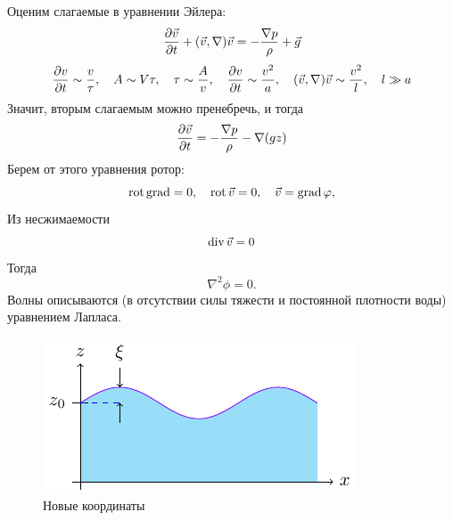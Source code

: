 Оценим слагаемые в уравнении Эйлера:
\begin{gather}
	\label{eq}
	\pdv{\vec{v}}{t}+(\vec{v},\nabla)\vec{v}=-\frac{\nabla p}{\rho}+\vec{g}
\end{gather}
\begin{gather}
	\label{eq}
	\pdv{v}{t}\sim\frac{v}{\tau}, \quad 
	A\sim V\tau, \quad \tau \sim \frac{A}{v},
	\quad \pdv{v}{t}\sim \frac{v^2}{a}, 
	\quad (\vec{v},\nabla)\vec{v}\sim \frac{v^2}{l},
	\quad l\gg a
\end{gather}
Значит, вторым слагаемым можно пренебречь, и тогда
\begin{gather}
	\label{eq}
	\pdv{\vec{v}}{t}=-\frac{\nabla p}{\rho}-\nabla(gz)
\end{gather}
Берем от этого уравнения ротор:
\begin{equation}
	\operatorname{rot}\operatorname{grad}=0, \quad
	\operatorname{rot}\vec{v}=0, \quad \vec{v}=\operatorname{grad}\varphi,
\end{equation}
Из несжимаемости
\begin{equation}
	\operatorname{div}\vec{v}=0
\end{equation}
Тогда
\begin{equation}
	\nabla^2\phi=0.
\end{equation}
Волны описываются (в отсутствии силы тяжести и постоянной плотности воды) уравнением Лапласа. 

\begin{figure}[H]
    \centering
    \includegraphics[scale=1.5]{img/simple_wave2}
    \caption{Новые координаты}
    \label{fig:simplewave2}
\end{figure}

